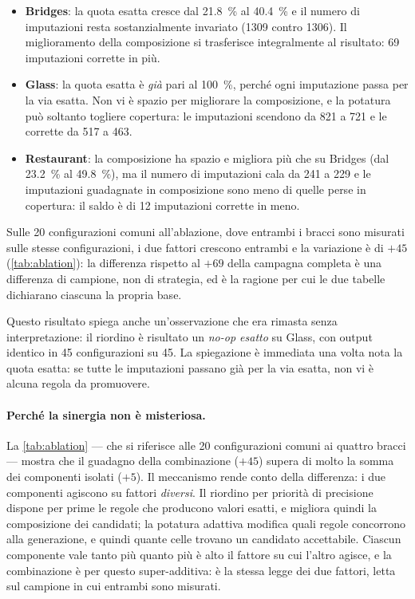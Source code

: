\begin{itemize}[leftmargin=1.4em]
    \item \textbf{Bridges}: la quota esatta cresce dal \SI{21.8}{\percent} al \SI{40.4}{\percent}
    e il numero di imputazioni resta sostanzialmente invariato (\num{1309} contro \num{1306}). Il
    miglioramento della composizione si trasferisce integralmente al risultato: \num{69}
    imputazioni corrette in più.
    \item \textbf{Glass}: la quota esatta è \emph{già} pari al \SI{100}{\percent}, perché ogni
    imputazione passa per la via esatta. Non vi è spazio per migliorare la composizione, e la
    potatura può soltanto togliere copertura: le imputazioni scendono da \num{821} a \num{721} e
    le corrette da \num{517} a \num{463}.
    \item \textbf{Restaurant}: la composizione ha spazio e migliora più che su Bridges (dal
    \SI{23.2}{\percent} al \SI{49.8}{\percent}), ma il numero di imputazioni cala da \num{241} a
    \num{229} e le imputazioni guadagnate in composizione sono meno di quelle perse in copertura:
    il saldo è di \num{12} imputazioni corrette in meno.
\end{itemize}

Sulle \num{20} configurazioni comuni all'ablazione, dove entrambi i bracci sono misurati sulle
stesse configurazioni, i due fattori crescono entrambi e la variazione è di $+45$
(\autoref{tab:ablation}): la differenza rispetto al $+69$ della campagna completa è una
differenza di campione, non di strategia, ed è la ragione per cui le due tabelle dichiarano
ciascuna la propria base.

Questo risultato spiega anche un'osservazione che era rimasta senza interpretazione: il riordino
 è risultato un \emph{no-op esatto} su Glass, con output identico in
\num{45} configurazioni su \num{45}. La spiegazione è immediata una volta nota la quota esatta:
se tutte le imputazioni passano già per la via esatta, non vi è alcuna regola da promuovere.

\paragraph{Perché la sinergia non è misteriosa.} La \autoref{tab:ablation} --- che si riferisce
alle \num{20} configurazioni comuni ai quattro bracci --- mostra che il guadagno della
combinazione ($+45$) supera di molto la somma dei componenti isolati ($+5$). Il meccanismo rende
conto della differenza: i due componenti agiscono su fattori \emph{diversi}. Il riordino per
priorità di precisione dispone per prime le regole che producono valori esatti, e migliora quindi
la composizione dei candidati; la potatura adattiva modifica quali regole concorrono alla
generazione, e quindi quante celle trovano un candidato accettabile. Ciascun componente vale
tanto più quanto più è alto il fattore su cui l'altro agisce, e la combinazione è per questo
super-additiva: è la stessa legge dei due fattori, letta sul campione in cui entrambi sono
misurati.

